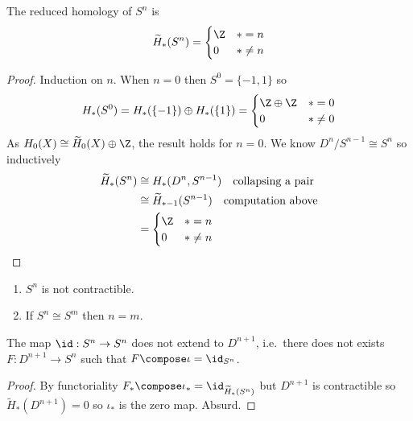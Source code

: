 \documentclass[a4paper]{article}
\begin{document}
\begin{proposition}
  The reduced homology of \(S^n\) is
  \begin{align*}
    \widetilde H_*(S^n) =
    \begin{cases}
      \Z & * = n \\
      0 & * \neq n
    \end{cases}
  \end{align*}
\end{proposition}

\begin{proof}
  Induction on \(n\). When \(n = 0\) then \(S^0 = \{-1, 1\}\) so
  \[
    H_*(S^0) = H_*(\{-1\}) \oplus H_*(\{1\}) =
    \begin{cases}
      \Z \oplus \Z & * = 0 \\
      0 & * \neq 0
    \end{cases}
  \]
  As \(H_0(X) \cong \widetilde H_0(X) \oplus \Z\), the result holds for \(n = 0\). We know \(D^n/S^{n - 1} \cong S^n\) so inductively
  \begin{align*}
    \widetilde H_*(S^n)
    &\cong H_*(D^n, S^{n - 1}) \quad \text{collapsing a pair} \\
    &\cong \widetilde H_{* - 1}(S^{n - 1}) \quad \text{computation above} \\
    &=
      \begin{cases}
        \Z & * = n \\
        0 & * \neq n
      \end{cases}
  \end{align*}
\end{proof}

\begin{corollary}\leavevmode
  \begin{enumerate}
  \item \(S^n\) is not contractible.
  \item If \(S^n \cong S^m\) then \(n = m\).
  \end{enumerate}
\end{corollary}

\begin{corollary}
  The map \(\id: S^n \to S^n\) does not extend to \(D^{n + 1}\), i.e.\ there does not exists \(F: D^{n + 1} \to S^n\) such that \(F \compose \iota = \id_{S^n}\).
\end{corollary}

\begin{proof}
  By functoriality \(F_* \compose \iota_* = \id_{\widetilde H_*(S^n)}\) but \(D^{n + 1}\) is contractible so \(\widetilde H_*(D^{n + 1}) = 0\) so \(\iota_*\) is the zero map. Absurd.
\end{proof}
\end{document}

